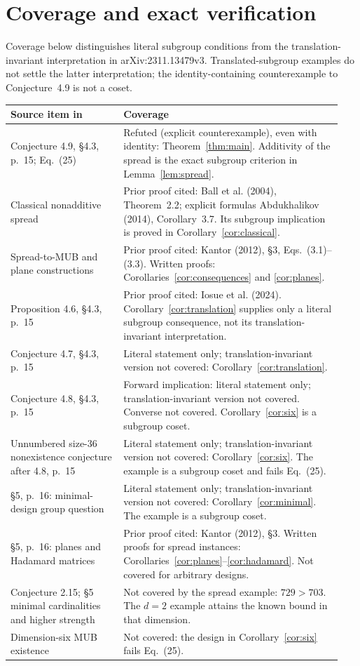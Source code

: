 \documentclass[11pt]{article}
\begin{document}
\section{Coverage and exact verification}
Coverage below distinguishes literal subgroup conditions from the translation-invariant interpretation in arXiv:2311.13479v3. Translated-subgroup examples do not settle the latter interpretation; the identity-containing counterexample to Conjecture~4.9 is not a coset.
\begin{center}\small
\begin{tabular}{@{}p{0.32\linewidth}p{0.62\linewidth}@{}}
\toprule
Source item in \cite{iosue} & Coverage\\\midrule
Conjecture 4.9, \S4.3, p.~15; Eq.~(25) & Refuted (explicit counterexample), even with identity: Theorem~\ref{thm:main}. Additivity of the spread is the exact subgroup criterion in Lemma~\ref{lem:spread}.\\
Classical nonadditive spread & Prior proof cited: Ball et al. (2004), Theorem~2.2; explicit formulas Abdukhalikov (2014), Corollary~3.7. Its subgroup implication is proved in Corollary~\ref{cor:classical}.\\
Spread-to-MUB and plane constructions & Prior proof cited: Kantor (2012), \S3, Eqs.~(3.1)--(3.3). Written proofs: Corollaries~\ref{cor:consequences} and \ref{cor:planes}.\\
Proposition 4.6, \S4.3, p.~15 & Prior proof cited: Iosue et al. (2024). Corollary~\ref{cor:translation} supplies only a literal subgroup consequence, not its translation-invariant interpretation.\\
Conjecture 4.7, \S4.3, p.~15 & Literal statement only; translation-invariant version not covered: Corollary~\ref{cor:translation}.\\
Conjecture 4.8, \S4.3, p.~15 & Forward implication: literal statement only; translation-invariant version not covered. Converse not covered. Corollary~\ref{cor:six} is a subgroup coset.\\
Unnumbered size-36 nonexistence conjecture after 4.8, p.~15 & Literal statement only; translation-invariant version not covered: Corollary~\ref{cor:six}. The example is a subgroup coset and fails Eq.~(25).\\
\S5, p.~16: minimal-design group question & Literal statement only; translation-invariant version not covered: Corollary~\ref{cor:minimal}. The example is a subgroup coset.\\
\S5, p.~16: planes and Hadamard matrices & Prior proof cited: Kantor (2012), \S3. Written proofs for spread instances: Corollaries~\ref{cor:planes}--\ref{cor:hadamard}. Not covered for arbitrary designs.\\
Conjecture 2.15; \S5 minimal cardinalities and higher strength & Not covered by the spread example: $729>703$. The $d=2$ example attains the known bound in that dimension.\\
Dimension-six MUB existence & Not covered: the design in Corollary~\ref{cor:six} fails Eq.~(25).\\
\bottomrule
\end{tabular}
\end{center}
\end{document}
